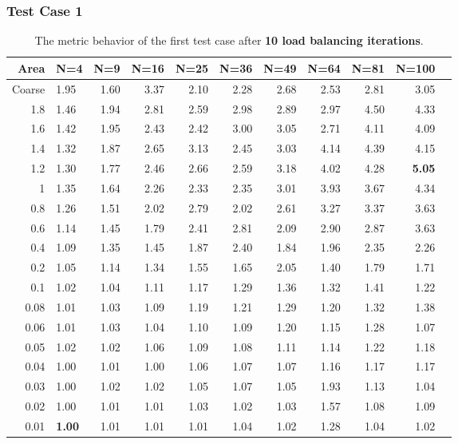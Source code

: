 \documentclass[]{beamer}
\begin{document}
\begin{frame}[t]\frametitle{Test Case 1}
\begin{table}[H]
\tiny
\centering
\caption{The metric behavior of the first test case after \textbf{10 load balancing iterations}.} 
\begin{tabular}{rlrrrrrrrrr}
  \hline
 Area & N=4 & N=9 & N=16 & N=25 & N=36 & N=49 & N=64 & N=81 & N=100 \\ 
  \hline
 Coarse & 1.95 & 1.60 & 3.37 & 2.10 & 2.28 & 2.68 & 2.53 & 2.81 & 3.05 \\ 
 1.8 & 1.46 & 1.94 & 2.81 & 2.59 & 2.98 & 2.89 & 2.97 & 4.50 & 4.33 \\ 
 1.6 & 1.42 & 1.95 & 2.43 & 2.42 & 3.00 & 3.05 & 2.71 & 4.11 & 4.09 \\ 
1.4 & 1.32 & 1.87 & 2.65 & 3.13 & 2.45 & 3.03 & 4.14 & 4.39 & 4.15 \\ 
 1.2 & 1.30 & 1.77 & 2.46 & 2.66 & 2.59 & 3.18 & 4.02 & 4.28 & \textbf{\cellcolor{blue!25}5.05} \\ 
  1 & 1.35 & 1.64 & 2.26 & 2.33 & 2.35 & 3.01 & 3.93 & 3.67 & 4.34 \\ 
 0.8 & 1.26 & 1.51 & 2.02 & 2.79 & 2.02 & 2.61 & 3.27 & 3.37 & 3.63 \\ 
 0.6 & 1.14 & 1.45 & 1.79 & 2.41 & 2.81 & 2.09 & 2.90 & 2.87 & 3.63 \\ 
   0.4 & 1.09 & 1.35 & 1.45 & 1.87 & 2.40 & 1.84 & 1.96 & 2.35 & 2.26 \\ 
   0.2 & 1.05 & 1.14 & 1.34 & 1.55 & 1.65 & 2.05 & 1.40 & 1.79 & 1.71 \\ 
  0.1 & 1.02 & 1.04 & 1.11 & 1.17 & 1.29 & 1.36 & 1.32 & 1.41 & 1.22 \\ 
  0.08 & 1.01 & 1.03 & 1.09 & 1.19 & 1.21 & 1.29 & 1.20 & 1.32 & 1.38 \\ 
   0.06 & 1.01 & 1.03 & 1.04 & 1.10 & 1.09 & 1.20 & 1.15 & 1.28 & 1.07 \\ 
   0.05 & 1.02 & 1.02 & 1.06 & 1.09 & 1.08 & 1.11 & 1.14 & 1.22 & 1.18 \\ 
   0.04 & 1.00 & 1.01 & 1.00 & 1.06 & 1.07 & 1.07 & 1.16 & 1.17 & 1.17 \\ 
   0.03 & 1.00 & 1.02 & 1.02 & 1.05 & 1.07 & 1.05 & 1.93 & 1.13 & 1.04 \\ 
   0.02 & 1.00 & 1.01 & 1.01 & 1.03 & 1.02 & 1.03 & 1.57 & 1.08 & 1.09 \\ 
   0.01 & \textbf{\cellcolor{blue!25}1.00} & 1.01 & 1.01 & 1.01 & 1.04 & 1.02 & 1.28 & 1.04 & 1.02 \\ 
   \hline
\end{tabular}
\end{table}
\end{frame}
\end{document}
